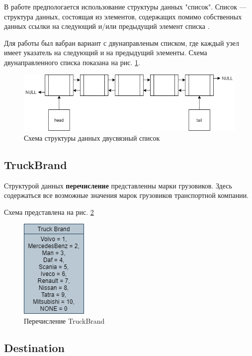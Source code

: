 В работе предпологается использование структуры данных "список".
Список --- структура данных, состоящая из элементов, 
содержащих помимо собственных данных ссылки на 
следующий и/или предыдущий элемент списка \cite{list_defenition}.

Для работы был вабран вариант с двунаправленым списком, 
где каждый узел имеет указатель на следующий и на предыдущий элементы.
Схема двунаправленного списка показана на рис. \ref{list_schema}.

\begin{figure}[hpt!]
    \centering
    \includegraphics[width=1\linewidth]{photo/data_structures/list_schema}
    \caption{Схема структуры данных двусвязный список}
    \label{list_schema}
\end{figure}

\subsection{TruckBrand}

Структурой данных \textbf{перечисление} представленны марки грузовиков.
Здесь содержаться все возможные значения марок грузовиков транспортной компании. 

Схема представлена на рис. \ref{truck_brand}

\begin{figure}[hpt!]
    \centering
    \includegraphics[width=0.2\linewidth]{photo/data_structures/truck_brand}
    \caption{Перечисление TruckBrand}
    \label{truck_brand}
\end{figure}

\subsection{Destination}


